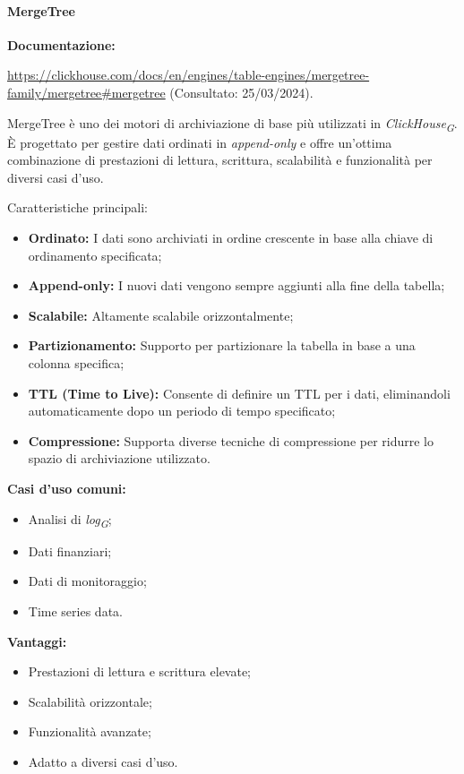 \paragraph{MergeTree}\label{sec:MergeTree}
\textbf{Documentazione:}

\url{https://clickhouse.com/docs/en/engines/table-engines/mergetree-family/mergetree#mergetree} (Consultato: 25/03/2024).

MergeTree è uno dei motori di archiviazione di base più utilizzati in \textit{ClickHouse}\textsubscript{\textit{G}}. È progettato per gestire dati ordinati in \textit{append-only} e offre un'ottima combinazione di prestazioni di lettura, scrittura, scalabilità e funzionalità per diversi casi d'uso.

Caratteristiche principali:
\begin{itemize}
	\item \textbf{Ordinato:} I dati sono archiviati in ordine crescente in base alla chiave di ordinamento specificata;
	\item \textbf{Append-only:} I nuovi dati vengono sempre aggiunti alla fine della tabella;
	\item \textbf{Scalabile:} Altamente scalabile orizzontalmente;
	\item \textbf{Partizionamento:} Supporto per partizionare la tabella in base a una colonna specifica;
	\item \textbf{TTL (Time to Live):} Consente di definire un TTL per i dati, eliminandoli automaticamente dopo un periodo di tempo specificato;
	\item \textbf{Compressione:} Supporta diverse tecniche di compressione per ridurre lo spazio di archiviazione utilizzato.
\end{itemize}

\textbf{Casi d'uso comuni:}
\begin{itemize}
  \item Analisi di \textit{log}\textsubscript{\textit{G}};
  \item Dati finanziari;
  \item Dati di monitoraggio;
  \item Time series data.
\end{itemize}

\textbf{Vantaggi:}
\begin{itemize}
  \item Prestazioni di lettura e scrittura elevate;
  \item Scalabilità orizzontale;
  \item Funzionalità avanzate;
  \item Adatto a diversi casi d'uso.
\end{itemize}

